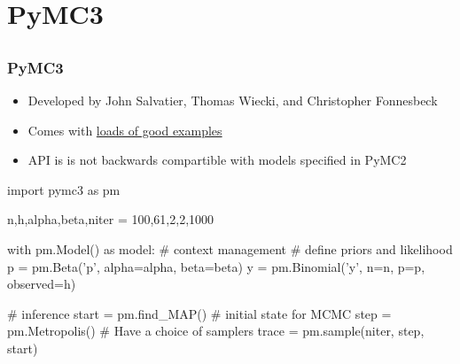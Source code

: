 \documentclass[table,dvipsnames]{beamer}
\begin{document}
\section{PyMC3}
\subsection{}

\begin{frame}[fragile]
\frametitle{PyMC3}
\footnotesize
\begin{itemize}
 \item Developed by John Salvatier, Thomas Wiecki, and Christopher Fonnesbeck \citep{Salvatier16}
 \item Comes with \href{https://github.com/pymc-devs/pymc3/tree/master/pymc3/examples}{loads of good examples}
 \item API is is not backwards compartible with models specified in PyMC2
\end{itemize}
\begin{code}
import pymc3 as pm

n,h,alpha,beta,niter = 100,61,2,2,1000

with pm.Model() as model: # context management
    # define priors and likelihood
    p = pm.Beta('p', alpha=alpha, beta=beta)
    y = pm.Binomial('y', n=n, p=p, observed=h)

    # inference
    start = pm.find_MAP() # initial state for MCMC
    step = pm.Metropolis() # Have a choice of samplers
    trace = pm.sample(niter, step, start)
\end{code}
\end{frame}
\end{document}
